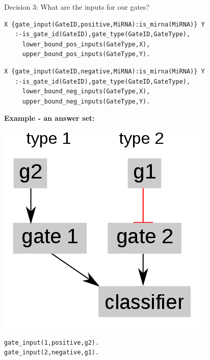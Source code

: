 \documentclass[10pt,dvipsnames]{beamer}
\begin{document}
\begin{frame}[fragile]{Decision 3: What are the inputs for our gates?}
\small
{\color{blue}{\large positive inputs:}}
\begin{verbatim}
X {gate_input(GateID,positive,MiRNA):is_mirna(MiRNA)} Y 
   :-is_gate_id(GateID),gate_type(GateID,GateType),
     lower_bound_pos_inputs(GateType,X), 
     upper_bound_pos_inputs(GateType,Y).
\end{verbatim}

{\color{blue}{\large negative inputs:}}
\begin{verbatim}
X {gate_input(GateID,negative,MiRNA):is_mirna(MiRNA)} Y 
   :-is_gate_id(GateID),gate_type(GateID,GateType),
     lower_bound_neg_inputs(GateType,X),
     upper_bound_neg_inputs(GateType,Y).
\end{verbatim}
\vspace{0.3cm}
{\large \color{orange} \textbf{Example - an answer set:}}
\vspace{0.3cm}

\begin{minipage}{0.45\textwidth}
\begin{center}
\includegraphics[scale=0.2]{exp3.png}
\end{center}
\end{minipage}
\hfill
\begin{minipage}{0.45\textwidth}
\begin{verbatim}
gate_input(1,positive,g2).
gate_input(2,negative,g1).
\end{verbatim}
\end{minipage}
\end{frame}
\end{document}
